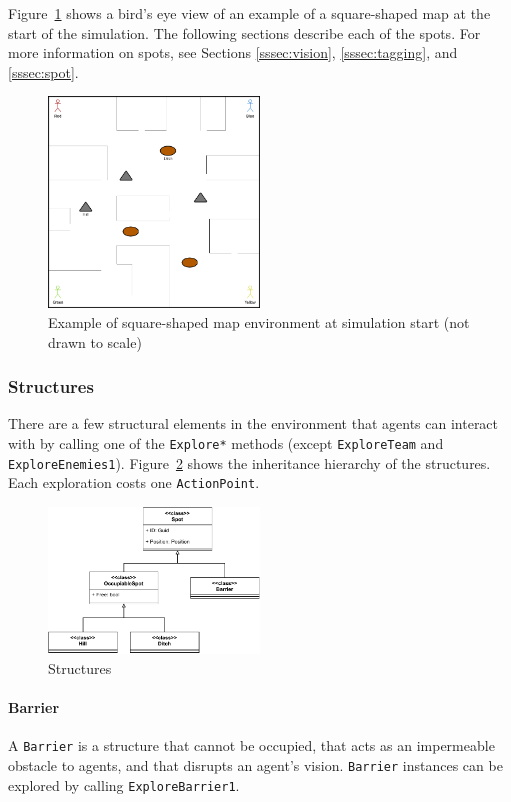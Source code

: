 \documentclass[a4paper,english,DIV=16,11pt,parskip=half,dvipsnames,listof=totoc,index=totoc,bibliography=totoc]{scrartcl}
\begin{document}
Figure~\ref{fig:envEx} shows a bird's eye view of an example of a square-shaped map at the start of the simulation. The following sections describe each of the spots. For more information on spots, see Sections \ref{sssec:vision}, \ref{sssec:tagging}, and \ref{sssec:spot}.
%
\begin{figure}[H]
  \centering
  \includegraphics[width=0.5\textwidth, height=0.5\textheight,keepaspectratio]{img/ExampleGameWorldAtSimStart.png}
  \caption{Example of square-shaped map environment at simulation start (not drawn to scale)}
  \label{fig:envEx}
\end{figure}
%
\subsubsection{Structures} \label{sssec:struc}
There are a few structural elements in the environment that agents can interact with by calling one of the \texttt{Explore*} methods (except \texttt{ExploreTeam} and \texttt{ExploreEnemies1}). Figure~\ref*{fig:structures} shows the inheritance hierarchy of the structures. Each exploration costs one \texttt{ActionPoint}.
%
\begin{figure}[H]
    \centering
    \includegraphics[width=0.5\textwidth, height=0.5\textheight,keepaspectratio]{img/lasertag-env-comps.pdf}
    \caption{Structures}
    \label{fig:structures}
\end{figure}
%
\paragraph{Barrier} \label{par:barrierDesc}
A \texttt{Barrier} is a structure that cannot be occupied, that acts as an impermeable obstacle to agents, and that disrupts an agent's vision. \texttt{Barrier} instances can be explored by calling \texttt{ExploreBarrier1}.
%
\end{document}

